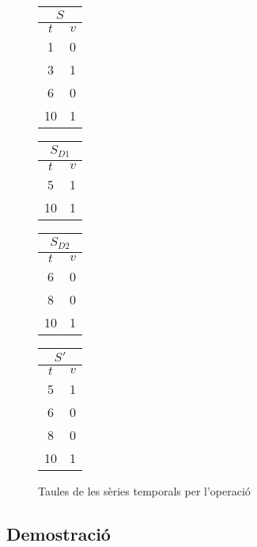 \begin{example}
\begin{figure}[tp]
  \centering
  \begin{tabular}[c]{|c|c|}
    \multicolumn{2}{c}{$S$} \\ \hline
    $t$  & $v$ \\ \hline
    1  & 0 \\
    3  & 1 \\
    6  & 0 \\
    10  & 1 \\ \hline
  \end{tabular} \qquad
  \begin{tabular}[c]{|c|c|}
    \multicolumn{2}{c}{$S_{D1}$} \\ \hline
    $t$  & $v$ \\ \hline
    5  & 1 \\
    10  & 1 \\ \hline
  \end{tabular} \qquad
  \begin{tabular}[c]{|c|c|}
    \multicolumn{2}{c}{$S_{D2}$} \\ \hline
    $t$  & $v$ \\ \hline
    6  & 0 \\
    8  & 0 \\
    10  & 1 \\ \hline
  \end{tabular} \qquad
  \begin{tabular}[c]{|c|c|}
    \multicolumn{2}{c}{$S'$} \\ \hline
    $t$  & $v$ \\ \hline
    5  & 1 \\
    6  & 0 \\
    8  & 0 \\
    10  & 1 \\ \hline
  \end{tabular}
  \caption{Taules de les sèries temporals per l'operació }
  \label{fig:multiresolucio:multiresolucio}
\end{figure}
 


\end{example}








\subsection{Demostració}

